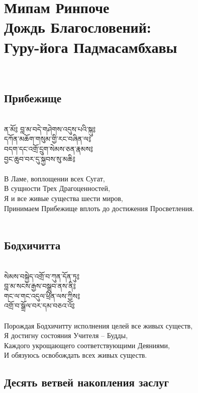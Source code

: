 \normalsize
\section{Мипам Ринпоче\\Дождь Благословений:\\Гуру-йога Падмасамбхавы}
\\
\vspace{1cm}

\subsection{Прибежище}
\\
\ti
ན་མོ༔ བླ་མ་བདེ་གཤེགས་འདུས་པའི་སྐུ༔\\
དཀོན་མཆོག་གསུམ་གྱི་རང་བཞིན་ལ༔\\
བདག་དང་འགྲོ་དྲུག་སེམས་ཅན་རྣམས༔\\
བྱང་ཆུབ་བར་དུ་སྐྱབས་སུ་མཆི༔\\
\\
\ru
В Ламе, воплощении всех Сугат,\\
В сущности Трех Драгоценностей,\\
Я и все живые существа шести миров,\\
Принимаем Прибежище вплоть до достижения Просветления.\\
\\


\subsection{Бодхичитта}
\\
\ti
སེམས་བསྐྱེད་འགྲོ་བ་ཀུན་དོན་ཏུ༔\\
བླ་མ་སངས་རྒྱས་བསྒྲུབ་ནས་ནི༔\\
གང་ལ་གང་འདུལ་ཕྲིན་ལས་ཀྱིས༔\\
འགྲོ་བ་སྒྲོལ་བར་དམ་བཅའ་འོ༔\\
\\
\ru
Порождая Бодхичитту исполнения целей все живых существ,\\
Я достигну состояния Учителя – Будды,\\
Каждого укрощающего соответствующими Деяниями,\\
И обязуюсь освобождать всех живых существ.\\

\newpage
\subsection{Десять ветвей накопления заслуг}

